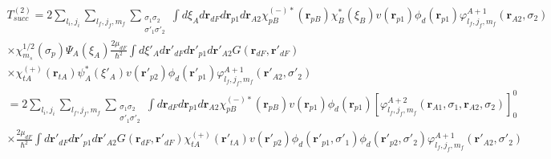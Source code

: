 \documentclass[a4paper,11pt]{book}
\numberwithin{equation}{section}
\numberwithin{figure}{section}
\numberwithin{table}{section}
\begin{document}
\begin{multline*}
T^{(2)}_{succ}=2\sum_{l_i,j_i}\sum_{l_f,j_f,m_f}\sum_{\substack{\sigma_1 \sigma_2\\\sigma'_1 \sigma'_2}}
\int d\xi_A d\mathbf{r}_{dF}d\mathbf{r}_{p1}d\mathbf{r}_{A2}
\chi^{(-)*}_{pB}(\mathbf{r}_{pB})\chi_B^*(\xi_B) v(\mathbf{r}_{p1})\phi_d(\mathbf r_{p1})\varphi^{A+1}_{l_f,j_f,m_f}(\mathbf r_{A2},\sigma_2)
\\
 \times \chi^{1/2}_{m_s}(\sigma_p)\Psi_A(\xi_A) \frac{2\mu_{dF}}{\hbar^2} \int  d\xi'_A d\mathbf{r}'_{dF}d\mathbf{r}'_{p1}d\mathbf{r}'_{A2}G(\mathbf{r}_{dF},\mathbf{r}'_{dF})\\
 \times \chi^{(+)}_{tA}(\mathbf{r}_{tA})\psi_A^*(\xi'_A) v(\mathbf{r'}_{p2})\phi_d(\mathbf r'_{p1})\varphi^{A+1}_{l_f,j_f,m_f}(\mathbf r'_{A2},\sigma'_2)\\
 =2\sum_{l_i,j_i}\sum_{l_f,j_f,m_f}\sum_{\substack{\sigma_1 \sigma_2\\\sigma'_1 \sigma'_2}}
 \int d\mathbf{r}_{dF}d\mathbf{r}_{p1}d\mathbf{r}_{A2}
 \chi^{(-)*}_{pB}(\mathbf{r}_{pB}) v(\mathbf{r}_{p1})\phi_d(\mathbf r_{p1})\left[\varphi^{A+2}_{l_f,j_f,m_f}(\mathbf r_{A1},\sigma_1,\mathbf r_{A2},\sigma_2)\right]^0_0
 \\
  \times  \frac{2\mu_{dF}}{\hbar^2} \int   d\mathbf{r}'_{dF}d\mathbf{r}'_{p1}d\mathbf{r}'_{A2}G(\mathbf{r}_{dF},\mathbf{r}'_{dF}) \chi^{(+)}_{tA}(\mathbf{r}'_{tA}) v(\mathbf{r'}_{p2})\phi_d(\mathbf r'_{p1},\sigma'_1)\phi_d(\mathbf r'_{p2},\sigma'_2)\varphi^{A+1}_{l_f,j_f,m_f}(\mathbf r'_{A2},\sigma'_2)  
\end{multline*} 
\end{document}
